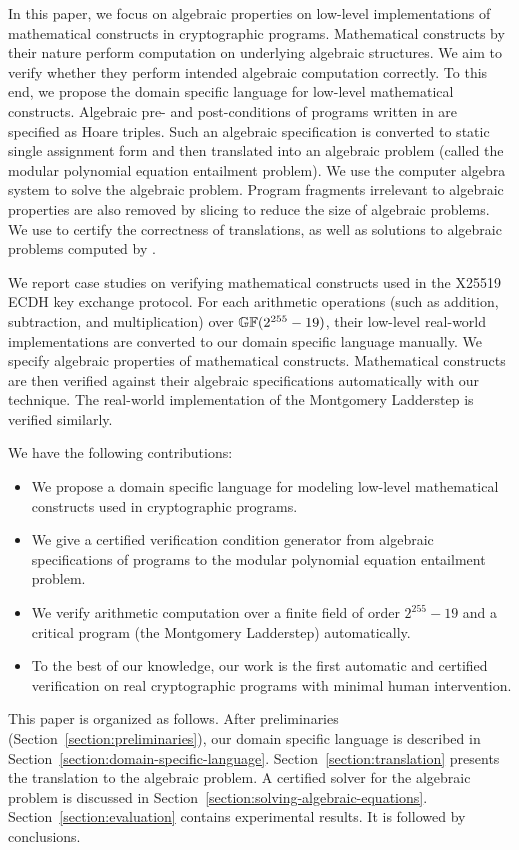 In this paper, we focus on algebraic properties on low-level
implementations of mathematical constructs in cryptographic programs.
Mathematical constructs by their nature perform computation on
underlying algebraic structures. We aim to verify whether they perform
intended algebraic computation correctly. To this end, we propose the
domain specific language \mydsl for low-level 
mathematical constructs. Algebraic pre- and post-conditions of
programs written in \mydsl are specified as Hoare
triples. Such an algebraic specification is converted to static single 
assignment form and then translated into an algebraic problem (called 
the modular polynomial equation entailment problem). We use the computer
algebra system \singular to solve the algebraic problem. 
Program fragments irrelevant to algebraic properties are also
removed by slicing to reduce the size of algebraic problems.
We use \coq to certify the
correctness of translations, as well as solutions to algebraic
problems computed by \singular.

We report case studies on verifying mathematical constructs used in
the X25519 ECDH key exchange protocol. For each arithmetic operations
(such as addition, subtraction, and multiplication) over $\mathbb{GF}(2^{255} - 19)$,
their low-level real-world implementations are converted to our domain
specific language \mydsl manually. We specify algebraic properties
of mathematical constructs. Mathematical constructs
are then verified against their algebraic
specifications automatically with our technique. 
The real-world implementation of the Montgomery Ladderstep is 
verified similarly.  


We have the following contributions:
\begin{itemize}
\item We propose a domain specific language \mydsl for modeling low-level
  mathematical constructs used in cryptographic programs.
\item We give a certified verification condition generator from
  algebraic specifications of programs to the modular polynomial
  equation entailment problem.
\item We verify arithmetic computation over a finite field of order
  $2^{255} - 19$ and a
  critical program (the Montgomery Ladderstep) automatically.
\item To the best of our knowledge, our work is the first automatic
  and certified verification on real cryptographic programs with
  minimal human intervention.
\end{itemize}

This paper is organized as follows. After preliminaries
(Section~\ref{section:preliminaries}), our domain specific
language is described in Section~\ref{section:domain-specific-language}. 
Section~\ref{section:translation}
presents the translation to the algebraic
problem. A certified solver for the algebraic problem is discussed in
Section~\ref{section:solving-algebraic-equations}. 
Section~\ref{section:evaluation} contains experimental results. It is
followed by conclusions.

